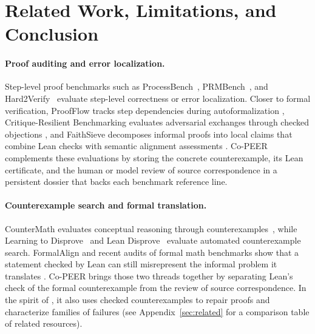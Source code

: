 \section{Related Work, Limitations, and Conclusion}
\label{sec:discussion}
\label{sec:conclusion}
\paragraph{Proof auditing and error localization.}
Step-level proof benchmarks such as ProcessBench~\citep{zheng2025processbench}, PRMBench~\citep{song2025prmbench}, and Hard2Verify~\citep{pandit2025hard2verify} evaluate step-level correctness or error localization. Closer to formal verification, ProofFlow tracks step dependencies during autoformalization \citep{cabral2026proofflow}, Critique-Resilient Benchmarking evaluates adversarial exchanges through checked objections \citep{marro2026crb}, and FaithSieve decomposes informal proofs into local claims that combine Lean checks with semantic alignment assessments \citep{wang2026faithsieve}. Co-PEER complements these evaluations by storing the concrete counterexample, its Lean certificate, and the human or model review of source correspondence in a persistent dossier that backs each benchmark reference line.

\paragraph{Counterexample search and formal translation.}
CounterMath evaluates conceptual reasoning through counterexamples~\citep{li2025countermath}, while Learning to Disprove~\citep{li2026disprove} and Lean Disprove~\citep{ondras2026disprove} evaluate automated counterexample search. FormalAlign and recent audits of formal math benchmarks show that a statement checked by Lean can still misrepresent the informal problem it translates \citep{lu2025formalalign,ammanamanchi2026faults}. Co-PEER brings those two threads together by separating Lean's check of the formal counterexample from the review of source correspondence. In the spirit of \citet{lakatos1976proofs}, it also uses checked counterexamples to repair proofs and characterize families of failures (see Appendix~\ref{sec:related} for a comparison table of related resources).

